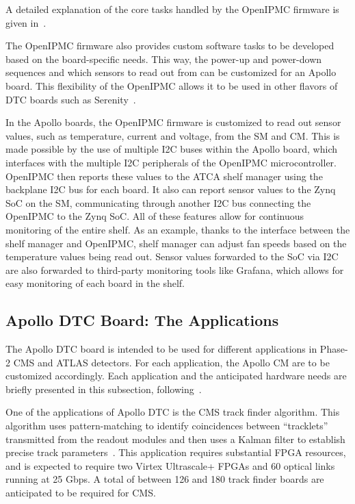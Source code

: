 A detailed explanation of the core tasks handled by the OpenIPMC firmware is given in~\cite{Calligaris:OpenIPMC}.

The OpenIPMC firmware also provides custom software tasks to be developed based on the board-specific needs.
This way, the power-up and power-down sequences and which sensors to read out from can be customized for an
Apollo board. This flexibility of the OpenIPMC allows it to be used in other flavors of DTC boards such as
Serenity~\cite{CMS:SerenityPaper}.

In the Apollo boards, the OpenIPMC firmware is customized to read out sensor values, such as temperature, 
current and voltage, from the SM and CM. 
This is made possible by the use of multiple I2C buses within the Apollo board, which
interfaces with the multiple I2C peripherals of the OpenIPMC microcontroller. OpenIPMC then reports these
values to the ATCA shelf manager using the backplane I2C bus for each board. It also can report sensor values
to the Zynq SoC on the SM, communicating through another I2C bus connecting the OpenIPMC to the Zynq SoC. 
All of these features allow for continuous 
monitoring of the entire shelf. As an example, thanks to the interface between the shelf manager and OpenIPMC,
shelf manager can adjust fan speeds based on the temperature values being read out. Sensor values forwarded to
the SoC via I2C are also forwarded to third-party monitoring tools like Grafana, which allows for easy monitoring
of each board in the shelf. 

\subsection{Apollo DTC Board: The Applications}

The Apollo DTC board is intended to be used for different applications in Phase-2 CMS and ATLAS detectors.
For each application, the Apollo CM are to be customized accordingly. Each application and the anticipated
hardware needs are briefly presented in this subsection, following~\cite{CMS:ApolloPaper}.

One of the applications of Apollo DTC is the CMS track finder algorithm. This algorithm uses 
pattern-matching to identify coincidences between “tracklets”
transmitted from the readout modules and then uses a Kalman filter to establish precise track 
parameters~\cite{CMS:ApolloPaper}. This application requires substantial FPGA resources, and is expected
to require two Virtex Ultrascale+ FPGAs and 60 optical links running at 25 Gbps. A total of 
between 126 and 180 track finder boards are anticipated to be required for CMS.

